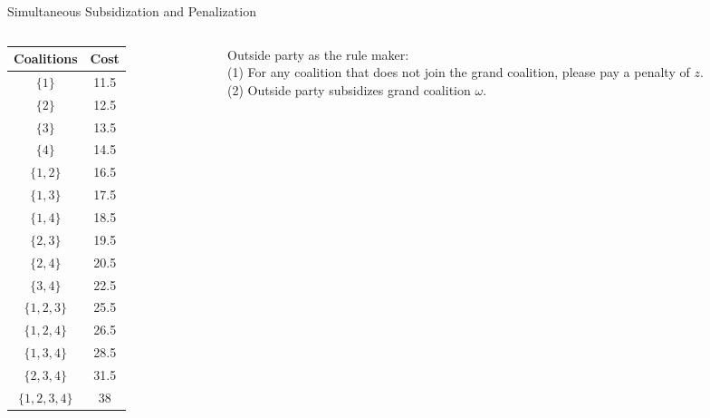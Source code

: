 \documentclass[14pt]{beamer}
\begin{document}
\begin{frame}{Simultaneous Subsidization and Penalization }
\small
\vspace{-4mm}
\begin{columns}
\begin{column}{4.5cm}
\begin{table}[H]
\centering
\tabcolsep=8pt
\footnotesize
\renewcommand\arraystretch{1.1}
\vspace{-3mm}
\begin{tabular}[!h]{c c }
\hline
\multicolumn{1}{c}{Coalitions} &\multicolumn{1}{c}{Cost}\\
\hline
$\{1\}$		&11.5	\\

$\{2\}$		&12.5	\\

$\{3\}$		&13.5	\\

$\{4\}$		&14.5  \\

$\{1,2\}$		&16.5	\\

$\{1,3\}$		&17.5	\\

$\{1,4\}$		&18.5	\\

$\{2,3\}$		&19.5	\\

$\{2,4\}$		&20.5	\\

$\{3,4\}$		&22.5	\\

$\{1,2,3\}$		&25.5	\\

$\{1,2,4\}$		&26.5	\\

$\{1,3,4\}$		&28.5	\\

$\{2,3,4\}$		&31.5	\\

$\{1,2,3,4\}$	&38	\\
\hline
\end{tabular}
\end{table}
\end{column}

\begin{column}{7cm}
\small
\vspace{0.5em}
Outside party as the rule maker:\\
\vspace{1em}
\footnotesize
(1) For any coalition that does not join the grand coalition, please pay a penalty of $z$. \\
\vspace{0.5em}
(2) Outside party subsidizes grand coalition $\omega$.


\end{column}
\end{columns}
\end{frame}
\end{document}
